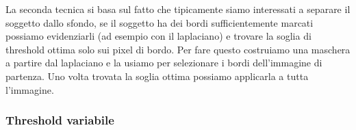 La seconda tecnica si basa sul fatto che tipicamente siamo interessati a separare il soggetto dallo sfondo, se il soggetto ha dei bordi sufficientemente marcati possiamo evidenziarli (ad esempio con il laplaciano) e trovare la soglia di threshold ottima solo sui pixel di bordo. Per fare questo costruiamo una maschera a partire dal laplaciano e la usiamo per selezionare i bordi dell'immagine di partenza. Uno volta trovata la soglia ottima possiamo applicarla a tutta l'immagine.

\subsubsection{Threshold variabile}
\begin{figure}
	\vspace{-.8cm}
	\centering

\end{figure}
